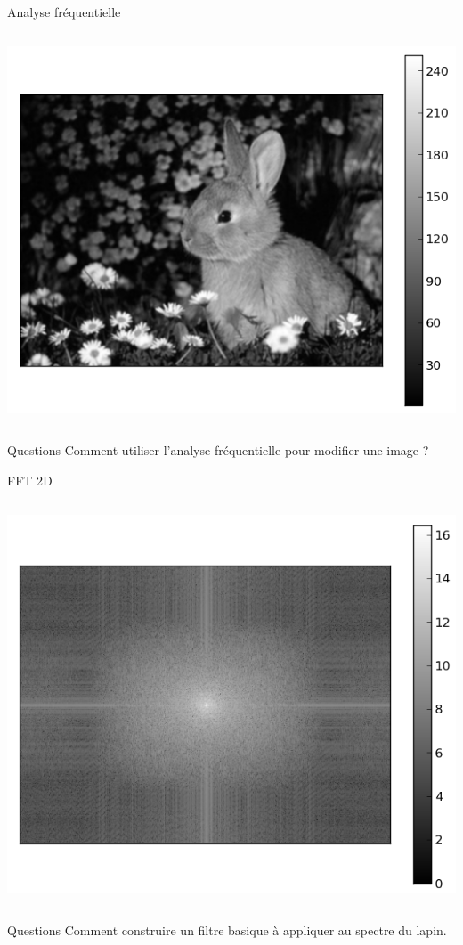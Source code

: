 \documentclass[8pt,a4paper]{beamer}
\begin{document}
\begin{frame}{Analyse fréquentielle}
 \begin{columns}
\includegraphics[width=1.\textwidth]{figures/lapin_original.png}

\end{columns}
\begin{alertblock}{Questions}
Comment utiliser l'analyse fréquentielle pour modifier une image ?
\end{alertblock}
\end{frame}

\begin{frame}{FFT 2D}
 \begin{columns}
\includegraphics[width=1.\textwidth]{figures/lapin_spectre.png}

\end{columns}
\begin{alertblock}{Questions}
Comment construire un filtre basique à appliquer au spectre du lapin.
\end{alertblock}
\end{frame}
\end{document}
